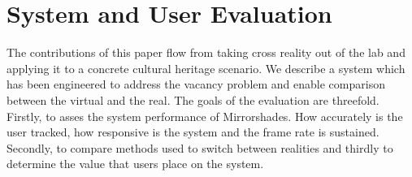 \documentclass[conference]{acmsiggraph}
\begin{document}
\section{System and User Evaluation}
\label{investigation1}




The contributions of this paper flow from taking cross reality out of the lab and applying it to a concrete cultural heritage scenario. We describe a system which has been engineered to address the vacancy problem and enable comparison between the virtual and the real. The goals of the evaluation are threefold. Firstly, to asses the system performance of Mirrorshades. How accurately is the user tracked, how responsive is the system and the frame rate is sustained. Secondly, to compare methods used to switch between realities and thirdly to determine the value that users place on the system.
\end{document}
